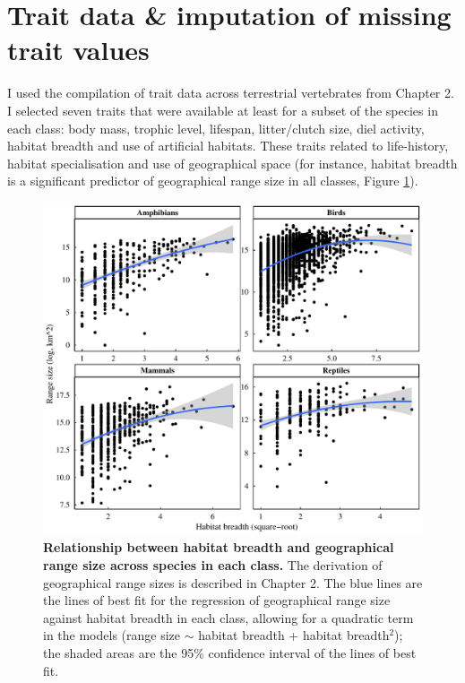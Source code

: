 \pagebreak
\clearpage

\section{Trait data \& imputation of missing trait values}

I used the compilation of trait data across terrestrial vertebrates from Chapter 2. I selected seven traits that were available at least for a subset of the species in each class: body mass, trophic level, lifespan, litter/clutch size, diel activity, habitat breadth and use of artificial habitats. These traits related to life-history, habitat specialisation and use of geographical space (for instance, habitat breadth is a significant predictor of geographical range size in all classes, Figure \ref{SI3_F3}). 

\begin{figure}[h!]
\centering
\includegraphics[scale=0.6]{Supporting/Chapter3/Figures/SI_Rangesize_HB}
\caption[Relationship between habitat breadth and geographical range size across species in each class]{\textbf{Relationship between habitat breadth and geographical range size across species in each class.} The derivation of geographical range sizes is described in Chapter 2. The blue lines are the lines of best fit for the regression of geographical range size against habitat breadth in each class, allowing for a quadratic term in the models (range size $\sim$ habitat breadth + habitat breadth$^2$); the shaded areas are the 95\% confidence interval of the lines of best fit.}
\label{SI3_F3}
\end{figure}

